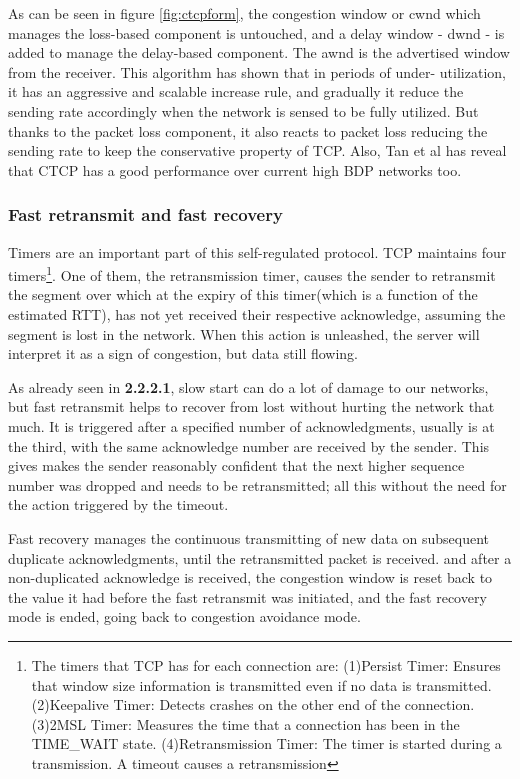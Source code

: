 As can be seen in figure \ref{fig:ctcpform}, the congestion window or cwnd
which manages the loss-based component is untouched, and a delay window - dwnd
- is added to manage the delay-based component.  The awnd is the advertised
window from the receiver. This algorithm has shown that in periods of under-
utilization, it has an aggressive and scalable increase rule, and gradually it
reduce the sending rate accordingly when the network is sensed to be fully
utilized. But thanks to the packet loss component, it also reacts to packet
loss reducing the sending rate to keep the conservative property of TCP. Also,
Tan et al\cite{Tan06compoundtcp} has reveal that CTCP has a good performance
over current high BDP networks too.

\subsubsection{Fast retransmit and fast recovery} 
Timers are an important part of this self-regulated protocol. TCP maintains
four timers\footnote{The timers that TCP has for each connection are:
(1)Persist Timer: Ensures that window size information is transmitted even  if
no data is transmitted. (2)Keepalive Timer: Detects crashes on the other end
of the connection. (3)2MSL Timer: Measures the time that a connection has been
in the TIME\_WAIT state. (4)Retransmission Timer: The timer is started during
a transmission. A timeout causes a retransmission}. One of them, the
retransmission timer, causes the sender to retransmit the segment over which
at the expiry of this timer(which is a function of the estimated RTT), has not
yet received their respective acknowledge, assuming the segment is lost in the
network. When this action is unleashed, the server will interpret it as a sign
of congestion, but data still flowing.

As already seen in \textbf{2.2.2.1}, slow start can do a lot of damage to our
networks, but fast retransmit helps to recover from lost without hurting the
network that much. It is triggered after a specified number of
acknowledgments, usually is at the third, with the same acknowledge number are
received by the sender. This gives makes the sender reasonably confident that
the next higher sequence number was dropped and needs to be retransmitted; all
this without the need for the action triggered by the timeout.

Fast recovery manages the continuous transmitting of new data on subsequent
duplicate acknowledgments, until the retransmitted packet is received. and
after a non-duplicated acknowledge is received, the congestion window is reset
back to the value it had before the fast retransmit was initiated, and the
fast recovery mode is ended, going back to congestion avoidance mode.
